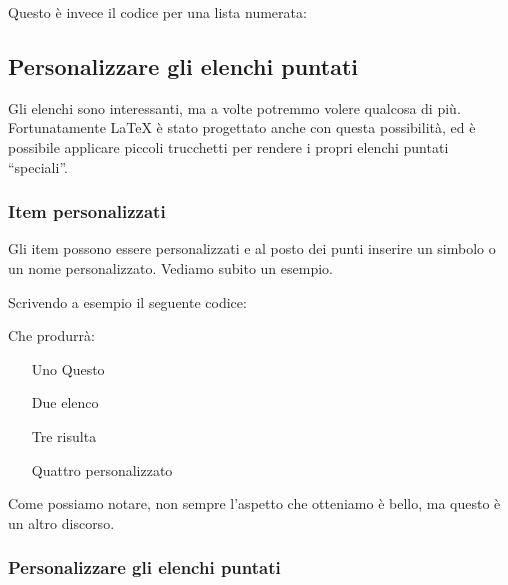 \vspace{\abovedisplayskip}
\begin{minipage}{\linewidth}
  \noindent Questo è invece il codice per una lista numerata:
  
\end{minipage}
\vspace{\belowdisplayskip}


\subsection{Personalizzare gli elenchi puntati}

Gli elenchi sono interessanti, ma a volte potremmo volere qualcosa di più.
Fortunatamente \LaTeX{} è stato progettato anche con questa possibilità, ed è
possibile applicare piccoli trucchetti per rendere i propri elenchi puntati
``speciali''.

\subsubsection{Item personalizzati}

Gli item possono essere personalizzati e al posto dei punti inserire un simbolo
o un nome personalizzato. Vediamo subito un esempio.

Scrivendo a esempio il seguente codice:



\vspace{\abovedisplayskip}
\begin{minipage}{\linewidth}
  Che produrrà:

  \begin{itemize}
    \item[Uno] Questo
    \item[Due] elenco
    \item[Tre] risulta
    \item[Quattro] personalizzato
  \end{itemize}

\end{minipage}
\vspace{\belowdisplayskip}


\noindent Come possiamo notare, non sempre l'aspetto che otteniamo è bello, ma
questo è un altro discorso.

\subsubsection{Personalizzare gli elenchi puntati}

